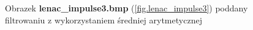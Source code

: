 \documentclass{classrep}
\begin{document}
\begin{figure}
{{  \label{fig.lenac_impulse3_average_5x5}
 }
}
\caption{Obrazek \textbf{lenac\_impulse3.bmp} (\ref{fig.lenac_impulse3}) poddany filtrowaniu z wykorzystaniem średniej arytmetycznej}
\label{fig.lenac_impulse3_average}
\end{figure}
\end{document}
